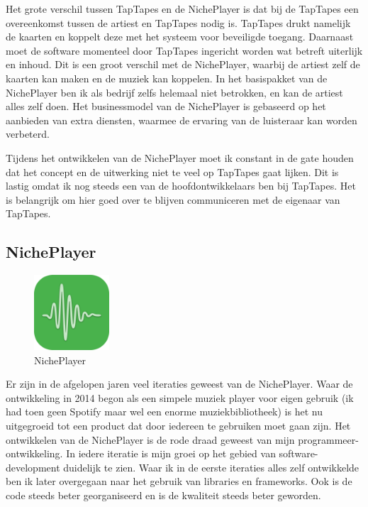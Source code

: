 Het grote verschil tussen TapTapes en de NichePlayer is dat bij de TapTapes een overeenkomst tussen de artiest en TapTapes nodig is. TapTapes drukt namelijk de kaarten  en koppelt deze met het systeem voor beveiligde toegang. Daarnaast moet de software momenteel door TapTapes ingericht worden wat betreft uiterlijk en inhoud. Dit is een groot verschil met de NichePlayer, waarbij de artiest zelf de kaarten kan maken en de muziek kan koppelen. In het basispakket van de NichePlayer ben ik als bedrijf zelfs helemaal niet betrokken, en kan de artiest alles zelf doen. Het businessmodel van de NichePlayer is gebaseerd op het aanbieden van extra diensten, waarmee de ervaring van de luisteraar kan worden verbeterd.

Tijdens het ontwikkelen van de NichePlayer moet ik constant in de gate houden dat het concept en de uitwerking niet te veel op TapTapes gaat lijken. Dit is lastig omdat ik nog steeds een van de hoofdontwikkelaars ben bij TapTapes. Het is belangrijk om hier goed over te blijven communiceren met de eigenaar van TapTapes.

\subsection{NichePlayer}
\begin{figure}
    \centering
    \includegraphics[width=0.25\textwidth]{assets/critical-review/NichePlayer.png}
    \caption{NichePlayer}
    \label{fig:critical-review:NichePlayer}
\end{figure}

Er zijn in de afgelopen jaren veel iteraties geweest van de NichePlayer. Waar de ontwikkeling in 2014 begon als een simpele muziek player voor eigen gebruik (ik had toen geen Spotify maar wel een enorme muziekbibliotheek) is het nu uitgegroeid tot een product dat door iedereen te gebruiken moet gaan zijn. Het ontwikkelen van de NichePlayer is de rode draad geweest van mijn programmeer-ontwikkeling. In iedere iteratie is mijn groei op het gebied van software-development duidelijk te zien. Waar ik in de eerste iteraties alles zelf ontwikkelde ben ik later overgegaan naar het gebruik van libraries en frameworks. Ook is de code steeds beter georganiseerd en is de kwaliteit steeds beter geworden.

